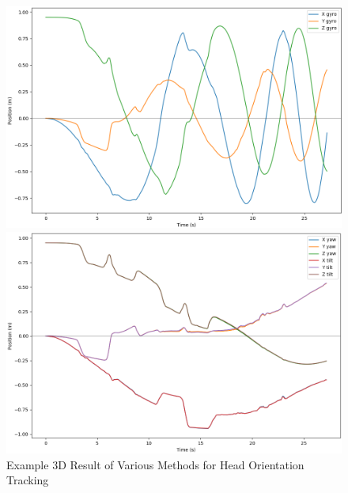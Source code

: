 \documentclass[11pt,a4paper]{article}
\begin{document}
	\begin{figure}[h!]
		\centering
		\begin{minipage}{0.45\linewidth}
			\includegraphics[width=0.9\linewidth]{figures/Position_Tracking_2D_Gyro}
		\end{minipage}		
		\begin{minipage}{0.45\linewidth}
			\includegraphics[width=0.9\linewidth]{figures/Position_Tracking_2D_Yaw_Tilt}
		\end{minipage}
		\caption{Example 3D Result of Various Methods for Head Orientation Tracking}
		\label{Position_2D}
	\end{figure}
\end{document}

